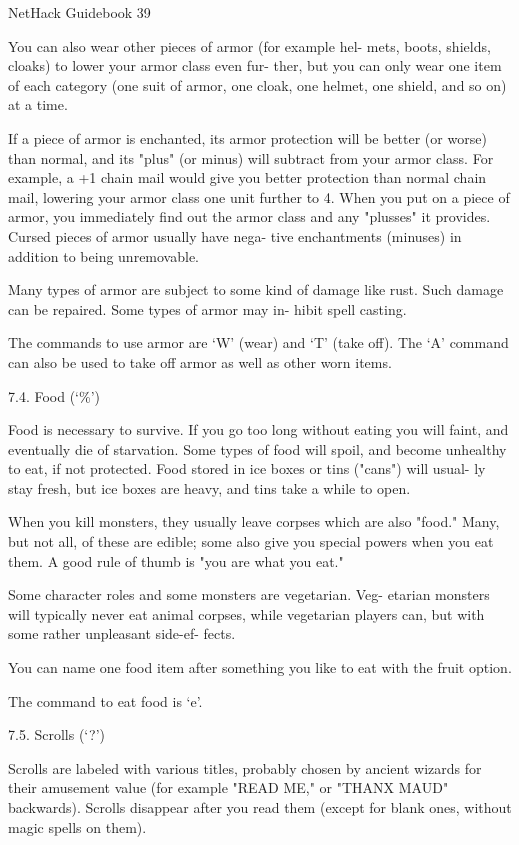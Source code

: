 \documentclass[11pt]{article}
\begin{document}
NetHack Guidebook                       39



   You can also wear other pieces of armor (for example hel-
mets, boots, shields, cloaks) to lower your armor class even fur-
ther, but you can only wear one item of each category (one suit
of armor, one cloak, one helmet, one shield, and so on) at a
time.

   If a piece of armor is enchanted, its armor protection will
be better (or worse) than normal, and its "plus" (or minus) will
subtract from your armor class. For example, a +1 chain mail
would give you better protection than normal chain mail, lowering
your armor class one unit further to 4. When you put on a piece
of armor, you immediately find out the armor class and any
"plusses" it provides. Cursed pieces of armor usually have nega-
tive enchantments (minuses) in addition to being unremovable.

   Many types of armor are subject to some kind of damage like
rust. Such damage can be repaired. Some types of armor may in-
hibit spell casting.

   The commands to use armor are `W' (wear) and `T' (take off).
The `A' command can also be used to take off armor as well as
other worn items.

7.4. Food (`\%')

   Food is necessary to survive. If you go too long without
eating you will faint, and eventually die of starvation.  Some
types of food will spoil, and become unhealthy to eat, if not
protected. Food stored in ice boxes or tins ("cans") will usual-
ly stay fresh, but ice boxes are heavy, and tins take a while to
open.

   When you kill monsters, they usually leave corpses which are
also "food."  Many, but not all, of these are edible; some also
give you special powers when you eat them. A good rule of thumb
is "you are what you eat."

   Some character roles and some monsters are vegetarian. Veg-
etarian monsters will typically never eat animal corpses, while
vegetarian players can, but with some rather unpleasant side-ef-
fects.

   You can name one food item after something you like to eat
with the fruit option.

The command to eat food is `e'.

7.5. Scrolls (`?')

   Scrolls are labeled with various titles, probably chosen by
ancient wizards for their amusement value (for example "READ ME,"
or "THANX MAUD" backwards).  Scrolls disappear after you read
them (except for blank ones, without magic spells on them).
\end{document}
